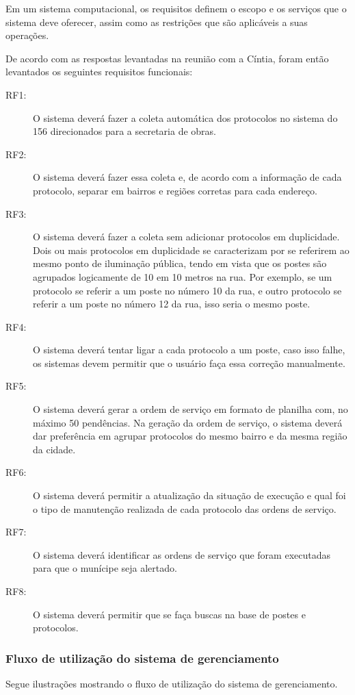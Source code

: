 \documentclass[
	article,			%
	11pt,				%
	oneside,			%
	a4paper,			%
	english,			%
	brazil,				%
	sumario=tradicional
	]{abntex2}
\begin{document}
Em um sistema computacional, os requisitos definem o escopo e os serviços que o
sistema deve oferecer, assim como as restrições que são aplicáveis a suas
operações.

De acordo com as respostas levantadas na reunião com a Cíntia, foram então levantados os seguintes requisitos funcionais:

\begin{description}
\item[RF1:] O sistema deverá fazer a coleta automática dos protocolos no sistema do 156
direcionados para a secretaria de obras.
\item[RF2:] O sistema deverá fazer essa coleta e, de acordo com a informação de cada
protocolo, separar em bairros e regiões corretas para cada endereço.
\item[RF3:] O sistema deverá fazer a coleta sem adicionar protocolos em duplicidade.
Dois ou mais protocolos em duplicidade se caracterizam por se referirem ao
mesmo ponto de iluminação pública, tendo em vista que os postes são agrupados
logicamente de 10 em 10 metros na rua. Por exemplo, se um protocolo se referir
a um poste no número 10 da rua, e outro protocolo se referir a um poste no número
12 da rua, isso seria o mesmo poste.
\item[RF4:] O sistema deverá tentar ligar a cada protocolo a um poste, caso isso falhe,
os sistemas devem permitir que o usuário faça essa correção manualmente.
\item[RF5:] O sistema deverá gerar a ordem de serviço em formato de planilha com,
no máximo 50 pendências. Na geração da ordem de serviço, o sistema deverá
dar preferência em agrupar protocolos do mesmo bairro e da mesma região da cidade.
\item[RF6:] O sistema deverá permitir a atualização da situação de execução e qual foi
o tipo de manutenção realizada de cada protocolo das ordens de serviço.
\item[RF7:] O sistema deverá identificar as ordens de serviço que foram executadas para
que o munícipe seja alertado.
\item[RF8:] O sistema deverá permitir que se faça buscas na base de postes e protocolos.
\end{description}

\subsubsection{Fluxo de utilização do sistema de gerenciamento}

Segue ilustrações mostrando o fluxo de utilização do sistema de gerenciamento.
\end{document}
